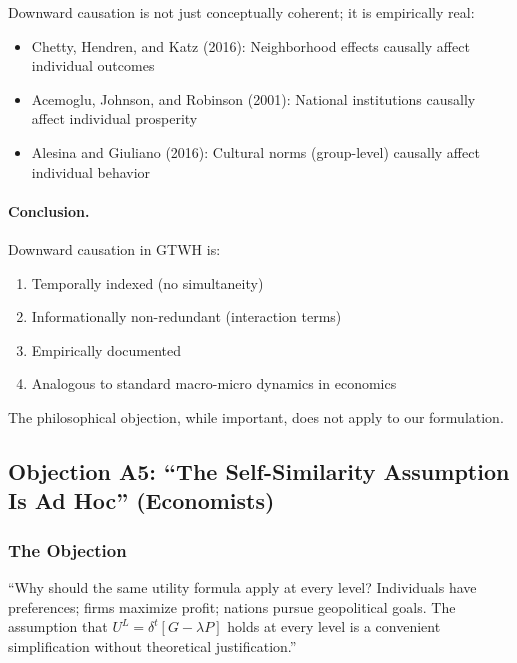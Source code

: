 \documentclass[12pt,a4paper]{article}
\begin{document}
Downward causation is not just conceptually coherent; it is empirically real:
\begin{itemize}[nosep]
\item Chetty, Hendren, and Katz (2016): Neighborhood effects causally affect individual outcomes
\item Acemoglu, Johnson, and Robinson (2001): National institutions causally affect individual prosperity
\item Alesina and Giuliano (2016): Cultural norms (group-level) causally affect individual behavior
\end{itemize}

\paragraph{Conclusion.}

Downward causation in GTWH is:
\begin{enumerate}[nosep]
\item Temporally indexed (no simultaneity)
\item Informationally non-redundant (interaction terms)
\item Empirically documented
\item Analogous to standard macro-micro dynamics in economics
\end{enumerate}

The philosophical objection, while important, does not apply to our formulation.

\subsection{Objection A5: ``The Self-Similarity Assumption Is Ad Hoc'' (Economists)}
\label{app:self-similarity}

\subsubsection{The Objection}

\begin{tcolorbox}[colback=red!5!white, colframe=red!75!black, title=Economist's Objection]
``Why should the same utility formula apply at every level? Individuals have 
preferences; firms maximize profit; nations pursue geopolitical goals. The 
assumption that $U^L = \delta^t[G - \lambda P]$ holds at every level is a 
convenient simplification without theoretical justification.''
\end{tcolorbox}
\end{document}
